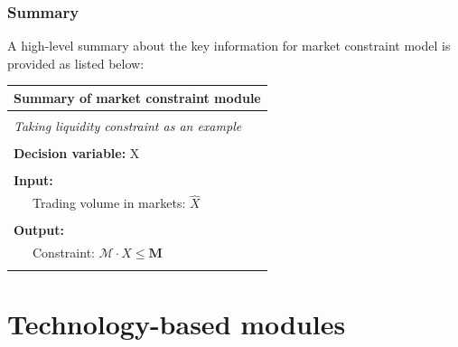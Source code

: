 \subsubsection{Summary}
A high-level summary about the key information for market constraint model is provided as listed below:
\begin{table}[h!]
	\begin{tabular}{L{0.95\textwidth}}
		\hline
		\textbf{Summary of market constraint module} \\
		\hline
		\\
		\textit{Taking liquidity constraint as an example}\\
		\\
		\textbf{Decision variable:} X\\
		\\
		\textbf{Input:} \\
		~~~Trading volume in markets: $\hat{X}$\\
		\\
		\textbf{Output:} \\
		~~~Constraint: $\mathcal{M} \cdot X \leq \mathbf{M}$ \\
		\\
		\hline
	\end{tabular}
\end{table}










\section{Technology-based modules}

